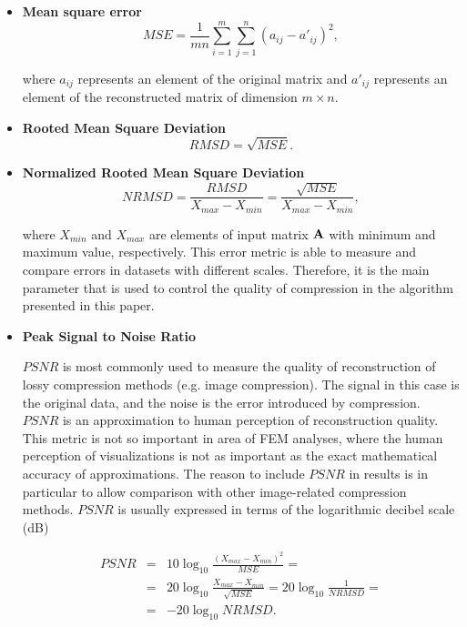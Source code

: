 \begin{itemize}
\item \textbf{Mean square error}
\begin{equation}
\mathit{MSE}=\frac{1}{m n} \sum_{i=1}^{m} \sum_{j=1}^{n} (a_{ij} - a'_{ij})^{2},
\label{eq:mse-def}
\end{equation}

\noindent
where $a_{ij}$ represents an element of the original matrix and $a'_{ij}$ represents an element of the
reconstructed matrix of dimension $m \times n$.

\item \textbf{Rooted Mean Square Deviation}
\begin{equation}
\mathit{RMSD} = \sqrt{\mathit{MSE}}.
\label{eq:rmsd-def}
\end{equation}

\item \textbf{Normalized Rooted Mean Square Deviation}
\begin{equation}
\mathit{NRMSD} = \frac{\mathit{RMSD}}{X_{max}-X_{min}}=\frac{\sqrt{\mathit{MSE}}}{X_{max}-X_{min}},
\label{eq:nrmsd-def}
\end{equation}

\noindent
where $X_{min}$ and $X_{max}$ are elements of input matrix $\mathbf{A}$ with minimum and maximum value, respectively. This error metric is able to measure and compare errors in datasets with different scales. Therefore, it is the main parameter that is used to control the quality of compression in the algorithm presented in this paper.

\item \textbf{Peak Signal to Noise Ratio}

$\mathit{PSNR}$ is most commonly used to measure the quality of reconstruction of lossy compression methods (e.g. image compression). The signal in this case is the original data, and the noise is the error introduced by compression. $\mathit{PSNR}$ is an approximation to human perception of reconstruction quality. This metric is not so important in area of FEM analyses, where the human perception of visualizations is not as important as the exact mathematical accuracy of approximations. The reason to include $\mathit{PSNR}$ in results is in particular to allow comparison with other image-related compression methods. $\mathit{PSNR}$ is usually expressed in terms of the logarithmic decibel scale (dB)

\begin{eqnarray}
\mathit{PSNR} &=& 10\log_{10}\frac{(X_{max}-X_{min})^{2}}{\mathit{MSE}} =
\\
&=& 20\log_{10}\frac{X_{max}-X_{min}}{\sqrt{\mathit{MSE}}}=20\log_{10}\frac{1}{\mathit{NRMSD}} = \nonumber
\\
&=& -20\log_{10}\mathit{NRMSD}. \nonumber
\label{eq:psnr-def}
\end{eqnarray}

\end{itemize}

